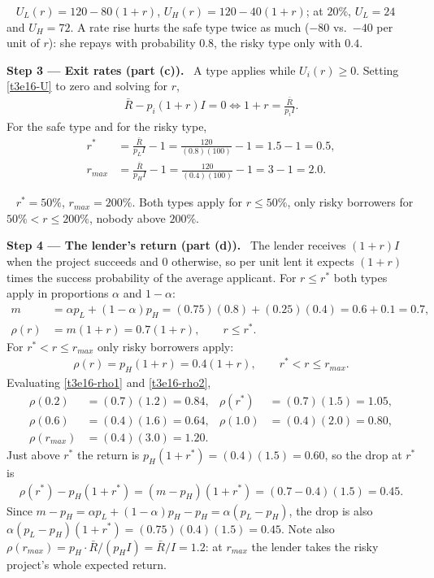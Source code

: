 \documentclass[11pt,a4paper]{article}
\newcommand{\step}[2]{\par\medskip\noindent\textbf{Step #1 --- #2.}~}
\newcommand{\answer}[1]{\par\smallskip\noindent\fbox{\textbf{Answer #1.}}~}
\begin{document}
\answer{(b)} $U_L(r)=120-80(1+r)$, $U_H(r)=120-40(1+r)$; at $20\%$, $U_L=24$ and $U_H=72$. A rate rise hurts the safe type twice as much ($-80$ vs.\ $-40$ per unit of $r$): she repays with probability $0.8$, the risky type only with $0.4$.

\step{3}{Exit rates (part (c))} A type applies while $U_i(r)\ge0$. Setting \eqref{t3e16-U} to zero and solving for $r$,
\begin{align}
  \bar R-p_i(1+r)I = 0 \iff 1+r = \frac{\bar R}{p_iI}. \nonumber
\end{align}
For the safe type and for the risky type,
\begin{align}
  r^* &= \frac{\bar R}{p_LI}-1 = \frac{120}{(0.8)(100)}-1 = 1.5-1 = 0.5, \label{t3e16-rstar}\\
  r_{max} &= \frac{\bar R}{p_HI}-1 = \frac{120}{(0.4)(100)}-1 = 3-1 = 2.0. \label{t3e16-rmax}
\end{align}

\answer{(c)} $r^*=50\%$, $r_{max}=200\%$. Both types apply for $r\le50\%$, only risky borrowers for $50\%<r\le200\%$, nobody above $200\%$.

\step{4}{The lender's return (part (d))} The lender receives $(1+r)I$ when the project succeeds and 0 otherwise, so per unit lent it expects $(1+r)$ times the success probability of the average applicant. For $r\le r^*$ both types apply in proportions $\alpha$ and $1-\alpha$:
\begin{align}
  m &= \alpha p_L+(1-\alpha)p_H = (0.75)(0.8)+(0.25)(0.4) = 0.6+0.1 = 0.7, \nonumber\\
  \rho(r) &= m(1+r) = 0.7(1+r), \qquad r\le r^*. \label{t3e16-rho1}
\end{align}
For $r^*<r\le r_{max}$ only risky borrowers apply:
\begin{align}
  \rho(r) = p_H(1+r) = 0.4(1+r), \qquad r^*<r\le r_{max}. \label{t3e16-rho2}
\end{align}
Evaluating \eqref{t3e16-rho1} and \eqref{t3e16-rho2},
\begin{align}
  \rho(0.2) &= (0.7)(1.2) = 0.84, & \rho(r^*) &= (0.7)(1.5) = 1.05, \nonumber\\
  \rho(0.6) &= (0.4)(1.6) = 0.64, & \rho(1.0) &= (0.4)(2.0) = 0.80, \nonumber\\
  \rho(r_{max}) &= (0.4)(3.0) = 1.20. \nonumber
\end{align}
Just above $r^*$ the return is $p_H(1+r^*)=(0.4)(1.5)=0.60$, so the drop at $r^*$ is
\begin{align}
  \rho(r^*)-p_H(1+r^*) = (m-p_H)(1+r^*) = (0.7-0.4)(1.5) = 0.45. \label{t3e16-drop}
\end{align}
Since $m-p_H=\alpha p_L+(1-\alpha)p_H-p_H=\alpha(p_L-p_H)$, the drop is also $\alpha(p_L-p_H)(1+r^*)=(0.75)(0.4)(1.5)=0.45$. Note also $\rho(r_{max})=p_H\cdot\bar R/(p_HI)=\bar R/I=1.2$: at $r_{max}$ the lender takes the risky project's whole expected return.
\end{document}
